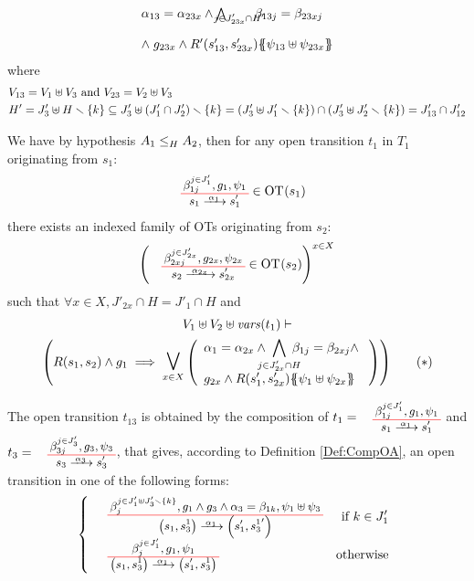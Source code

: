\documentclass[runningheads]{llncs}
\begin{document}
\begin{enumerate}
\begin{align*}
{\begin{array}{l}
			\alpha_{13} = \alpha_{23x} \wedge \bigwedge_\subbox{j \in J'_{23x} \cap H'} \beta_{13j} = \beta_{23xj} \\[12pt]
			\nwedge g_{23x} \wedge R'\mpar{s'_{13}, s'_{23x}}\psubst{\psi_{13} \uplus \psi_{23x}}
		\end{array}} 
	\end{align*}
where 
\begin{align*}
&V_{13}= V_1\uplus V_3 \text{ and }
V_{23}= V_2\uplus V_3\\
& H'=J_3'\uplus H \setminus \{k\} \subseteq J_3'\uplus \mpar{J_1' \cap J_2'} \setminus \{k\} = \mpar{J_3'\uplus J_1' \setminus \{k\} } \cap \mpar{J_3'\uplus J_2' \setminus \{k\}} = J_{13}'\cap J_{12}'\\
\end{align*}

\medskip

We have by hypothesis $\wrel{A_1}{A_2}{H}$, then for any open transition $t_1$ in $T_1$  originating from $s_1$:
\begin{align*}
\OTx{1}{}{1}{1} \in \fOT{s_1}
\end{align*}
there exists an indexed family of OTs originating from $s_{2}$: 
\begin{align*}
\mpar{\OTx{2}{x}{2x}{2x} \in \fOT{s_{2}}}^{x \in X} 
\end{align*}
such that $\forall x \in X, J'_{2x} \cap H = J'_1 \cap H$ and
\begin{multline*}
V_1 \uplus V_2 \uplus \fvars{t_1} \vdash\\ \mpar{R\mpar{s_1, s_{2}} \wedge g_1 \implies \operatorname*{\bigsymb{\bigvee}}_{x \in X} \mpar{\everymath{\displaystyle}
\begin{array}{l}
			\alpha_1 = \alpha_{2x} \wedge \bigwedge_\subbox{j \in J'_{2x} \cap H} \beta_{1j} = \beta_{2xj} \nwedge\\
			 g_{2x} \wedge R\mpar{s'_1, s'_{2x}}\psubst{\psi_1 \uplus \psi_{2x}}
		\end{array}}}  \qquad (*)
\end{multline*}	
\smallskip

The open transition $t_{13}$ is obtained by the composition of $t_1=\OTx{1}{}{1}{1}$ and $t_3=\OTx{3}{}{3}{3} $, that gives,  according to Definition \ref{Def:CompOA}, an open transition in one of the following forms:
\[
\choice{
\OT{\mpar{s_1, s^1_3}}{\mpar{s'_1, {s^1_3}'}}{\alpha_1}{\beta_j^{j \in J'_1 \uplus J'_3 \setminus \{k\}}}{g_1 \wedge g_3 \wedge \alpha_3 = \beta_{1k}}{\psi_1 \uplus \psi_3} & \text{ if } k \in J'_{1} \\
\OT{\mpar{s_1, s^1_3}}{\mpar{s'_1, s^1_3}}{\alpha_1}{\beta_j^{j \in J'_1}}{g_1}{\psi_1}& \text{otherwise}
}
\]



\end{enumerate}
\end{document}
